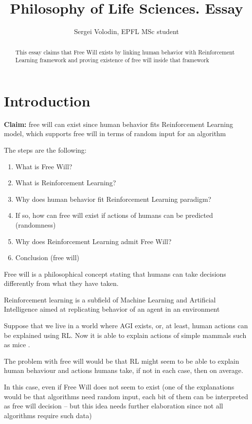 \documentclass[a4]{article}
\title{Philosophy of Life Sciences. Essay}
\author{Sergei Volodin, EPFL MSc student}
\begin{document}
\maketitle

\begin{abstract}
This essay claims that Free Will exists by linking human behavior with Reinforcement Learning framework and proving existence of free will inside that framework
\end{abstract}

\section{Introduction}
{\bf Claim:} free will can exist since human behavior fits Reinforcement Learning model, which supports free will in terms of random input for an algorithm

The steps are the following:
\begin{enumerate}
	\item What is Free Will?
	\item What is Reinforcement Learning?
	\item Why does human behavior fit Reinforcement Learning paradigm?
	\item If so, how can free will exist if actions of humans can be predicted (randomness)
	\item Why does Reinforcement Learning admit Free Will?
	\item Conclusion (free will)
\end{enumerate}

Free will is a philosophical concept stating that humans can take decisions differently from what they have taken.


Reinforcement learning is a subfield of Machine Learning and Artificial Intelligence aimed at replicating behavior of an agent in an environment \cite{sutton}

Suppose that we live in a world where AGI exists, or, at least, human actions can be explained using RL. Now it is able to explain actions of simple mammals such as mice \cite{oist}.

The problem with free will would be that RL might seem to be able to explain human behaviour and actions humans take, if not in each case, then on average.

In this case, even if Free Will does not seem to exist (one of the explanations would be that algorithms need random input, each bit of them can be interpreted as free will decision -- but this idea needs further elaboration since not all algorithms require such data)
\end{document}
